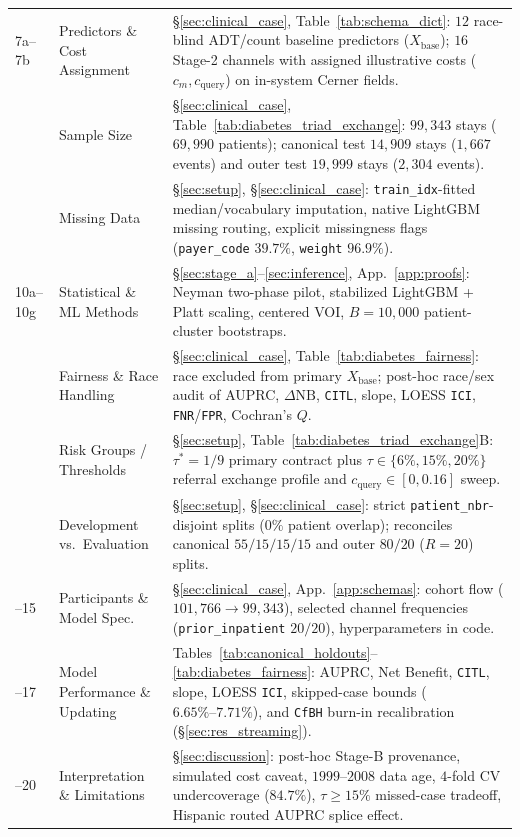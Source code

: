 \documentclass[11pt]{article}
\theoremstyle{remark}
\begin{document}
{\begin{longtable}{>{\raggedright\arraybackslash}p{1.2cm}>{\raggedright\arraybackslash}p{4.3cm}>{\raggedright\arraybackslash}p{9.3cm}}
7a--7b & Predictors \& Cost Assignment & \S\ref{sec:clinical_case}, Table~\ref{tab:schema_dict}: $12$ race-blind ADT/count baseline predictors ($X_{\text{base}}$); $16$ Stage-2 channels with assigned illustrative costs ($c_m, c_{\text{query}}$) on in-system Cerner fields. \\
8 & Sample Size & \S\ref{sec:clinical_case}, Table~\ref{tab:diabetes_triad_exchange}: $99{,}343$ stays ($69{,}990$ patients); canonical test $14{,}909$ stays ($1{,}667$ events) and outer test $19{,}999$ stays ($2{,}304$ events). \\
9 & Missing Data & \S\ref{sec:setup}, \S\ref{sec:clinical_case}: \texttt{train\_idx}-fitted median/vocabulary imputation, native LightGBM missing routing, explicit missingness flags (\texttt{payer\_code} $39.7\%$, \texttt{weight} $96.9\%$). \\
10a--10g & Statistical \& ML Methods & \S\ref{sec:stage_a}--\ref{sec:inference}, App.~\ref{app:proofs}: Neyman two-phase pilot, stabilized LightGBM + Platt scaling, centered VOI, $B=10{,}000$ patient-cluster bootstraps. \\
11 & Fairness \& Race Handling & \S\ref{sec:clinical_case}, Table~\ref{tab:diabetes_fairness}: race excluded from primary $X_{\text{base}}$; post-hoc race/sex audit of AUPRC, $\Delta\text{NB}$, \texttt{CITL}, slope, LOESS \texttt{ICI}, \texttt{FNR}/\texttt{FPR}, Cochran's $Q$. \\
12 & Risk Groups / Thresholds & \S\ref{sec:setup}, Table~\ref{tab:diabetes_triad_exchange}B: $\tau^* = 1/9$ primary contract plus $\tau \in \{6\%, 15\%, 20\%\}$ referral exchange profile and $c_{\text{query}} \in [0, 0.16]$ sweep. \\
13 & Development vs.\ Evaluation & \S\ref{sec:setup}, \S\ref{sec:clinical_case}: strict \texttt{patient\_nbr}-disjoint splits ($0\%$ patient overlap); reconciles canonical $55/15/15/15$ and outer $80/20$ ($R=20$) splits. \\
14--15 & Participants \& Model Spec. & \S\ref{sec:clinical_case}, App.~\ref{app:schemas}: cohort flow ($101{,}766 \to 99{,}343$), selected channel frequencies (\texttt{prior\_inpatient} $20/20$), hyperparameters in code. \\
16--17 & Model Performance \& Updating & Tables~\ref{tab:canonical_holdouts}--\ref{tab:diabetes_fairness}: AUPRC, Net Benefit, \texttt{CITL}, slope, LOESS \texttt{ICI}, skipped-case bounds ($6.65\%\text{--}7.71\%$), and \texttt{CfBH} burn-in recalibration (\S\ref{sec:res_streaming}). \\
18--20 & Interpretation \& Limitations & \S\ref{sec:discussion}: post-hoc Stage-B provenance, simulated cost caveat, $1999\text{--}2008$ data age, $4$-fold CV undercoverage ($84.7\%$), $\tau \ge 15\%$ missed-case tradeoff, Hispanic routed AUPRC splice effect. \\

\end{longtable}}
\end{document}
